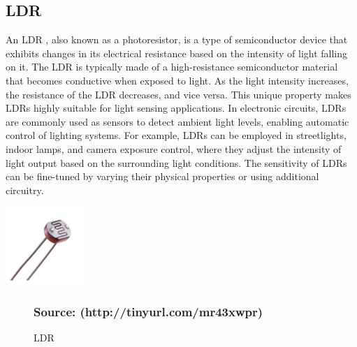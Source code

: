 \documentclass[12pt,a4paper]{report}
\begin{document}
	
	\subsection{LDR}
	
	\begin{justify}
		An LDR , also known as a photoresistor, is a type of semiconductor device that exhibits changes in its electrical resistance based on the intensity of light falling on it. The LDR is typically made of a high-resistance semiconductor material that becomes conductive when exposed to light. As the light intensity increases, the resistance of the LDR decreases, and vice versa. This unique property makes LDRs highly suitable for light sensing applications. In electronic circuits, LDRs are commonly used as sensors to detect ambient light levels, enabling automatic control of lighting systems. For example, LDRs can be employed in streetlights, indoor lamps, and camera exposure control, where they adjust the intensity of light output based on the surrounding light conditions. The sensitivity of LDRs can be fine-tuned by varying their physical properties or using additional circuitry.
	\end{justify}
	
	\begin{center}
		\includegraphics[width=0.22\textwidth]{images//ldr.jpg} \\
		
		\begin{figure}[ht]
			
			
			
			\caption{LDR}
			\label{fig:sample}
			\subsubsection{Source: (http://tinyurl.com/mr43xwpr)}
		\end{figure}
		
	\end{center}
	
	
	
	
	
\end{document}
